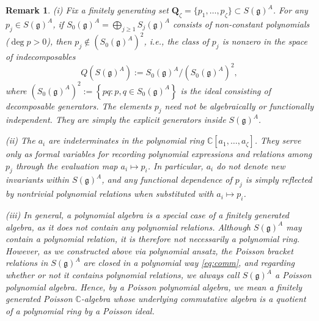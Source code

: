 \documentclass[11pt,reqno]{amsart}
\newtheorem*{theorem A}{Main Theorem A}
\newtheorem*{theorem B}{Main Theorem B}
\newtheorem*{theorem C}{Main Theorem C}
\newtheorem*{theorem D}{Main Theorem D}
\theoremstyle{definition}
\theoremstyle{plain}
\newtheorem{remark}[theorem]{Remark}
\theoremstyle{conclusion}
\begin{document}
\begin{remark}
\label{rem:generators}
(i) Fix a finitely generating set  $\mathbf{Q}_\zeta=\{p_1,\dots,p_\zeta\}\subset S(\mathfrak{g})^A$. For any $p_j \in S(\mathfrak{g})^A$, if $S_0(\mathfrak{g})^A=\bigoplus_{j\geq 1}S_j(\mathfrak{g})^A$ consists of non-constant polynomials ($\deg p >0$), then $p_j\notin (S_0(\mathfrak{g})^A)^2$, i.e., the class of $p_j$ is nonzero in the space of indecomposables $$Q(S(\mathfrak{g})^A):=S_0(\mathfrak{g})^A\big/\left(S_0(\mathfrak{g})^A\right)^2,$$ where $\left(S_0(\mathfrak{g})^A\right)^2:= \left\{pq: p,q \in S_0(\mathfrak{g})^A\right\}$ is the ideal consisting of decomposable generators. The elements $p_j$ need \emph{not} be algebraically or functionally independent. They are simply the explicit generators inside $S(\mathfrak{g})^A$.


(ii) The $a_i$ are indeterminates in the polynomial ring  $ \mathbb{C}[a_1,\dots,a_\zeta]$.  They serve only as formal variables for recording polynomial expressions and relations among $p_j$ through the evaluation map $a_i\mapsto p_i$. In particular, $a_i$ do not denote new invariants within $S(\mathfrak{g})^A$, and any functional dependence of $p_j$ is simply reflected by nontrivial polynomial relations when substituted with $a_i\mapsto p_i$.

(iii) In general, a polynomial algebra is a special case of a finitely generated algebra, as it does not contain any polynomial relations. Although $S(\mathfrak{g})^A$ may contain a polynomial relation, it is therefore not necessarily a polynomial ring. However, as we constructed above via polynomial ansatz, the Poisson bracket relations in $S(\mathfrak{g})^A$ are closed in a polynomial way \eqref{eq:comm}, and regarding whether or not it contains polynomial relations, we always call $S(\mathfrak{g})^A$ a Poisson polynomial algebra. Hence, by a Poisson polynomial algebra, we mean a finitely generated Poisson $\mathbb{C}$-algebra whose underlying commutative algebra is a quotient of a polynomial ring by a Poisson ideal.
\end{remark}
 

\end{document}
